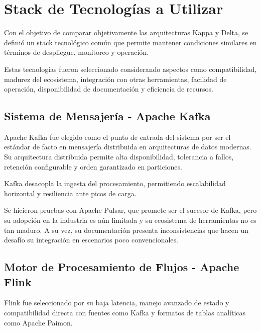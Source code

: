 \section{Stack de Tecnologías a Utilizar}

Con el objetivo de comparar objetivamente las arquitecturas Kappa y Delta, 
se definió un stack tecnológico común que permite mantener condiciones similares en términos de despliegue, 
monitoreo y operación.\newline 

Estas tecnologías fueron seleccionado considerando aspectos como compatibilidad, 
madurez del ecosistema, integración con otras herramientas, facilidad de operación, 
disponibilidad de documentación y eficiencia de recursos.

\subsection*{Sistema de Mensajería - Apache Kafka}

Apache Kafka fue elegido como el punto de entrada del sistema por ser el estándar de facto en mensajería distribuida en arquitecturas de datos modernas. 
Su arquitectura distribuida permite alta disponibilidad, tolerancia a fallos, retención configurable 
y orden garantizado en particiones. \newline

Kafka desacopla la ingesta del procesamiento, permitiendo escalabilidad horizontal 
y resiliencia ante picos de carga.\newline

Se hicieron pruebas con Apache Pulsar, que promete ser el sucesor de Kafka,
pero su adopción en la industria es aún limitada y su ecosistema de herramientas no es tan maduro.
A su vez, su documentación presenta inconsistencias que hacen un desafío su integración en escenarios poco convencionales. \newline

\newpage

\subsection*{Motor de Procesamiento de Flujos - Apache Flink}

Flink fue seleccionado por su baja latencia, manejo avanzado de estado y compatibilidad directa con fuentes como Kafka y formatos de tablas analíticas como Apache Paimon.\newline 

